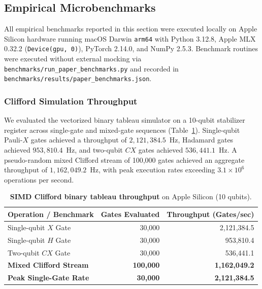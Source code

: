 \documentclass[aps,prx,twocolumn,superscriptaddress,nofootinbib]{revtex4-2}
\begin{document}
\subsection{Empirical Microbenchmarks}
\label{subsec:microbenchmarks}

All empirical benchmarks reported in this section were executed locally on Apple Silicon hardware running macOS Darwin \texttt{arm64} with Python 3.12.8, Apple MLX 0.32.2 (\texttt{Device(gpu, 0)}), PyTorch 2.14.0, and NumPy 2.5.3. Benchmark routines were executed without external mocking via \texttt{benchmarks/run\_paper\_benchmarks.py} and recorded in \texttt{benchmarks/results/paper\_benchmarks.json}.

\subsubsection{Clifford Simulation Throughput}
We evaluated the vectorized binary tableau simulator on a 10-qubit stabilizer register across single-gate and mixed-gate sequences (Table~\ref{tab:clifford_throughput}). Single-qubit Pauli-$X$ gates achieved a throughput of $2,121,384.5$~Hz, Hadamard gates achieved $953,810.4$~Hz, and two-qubit $CX$ gates achieved $536,441.1$~Hz. A pseudo-random mixed Clifford stream of 100,000 gates achieved an aggregate throughput of $1,162,049.2$~Hz, with peak execution rates exceeding $3.1 \times 10^6$ operations per second.

\begin{table}[h]
\centering
\caption{\textbf{SIMD Clifford binary tableau throughput} on Apple Silicon (10 qubits).}
\label{tab:clifford_throughput}
\begin{tabular}{@{}lrr@{}}
\toprule
\textbf{Operation / Benchmark} & \textbf{Gates Evaluated} & \textbf{Throughput (Gates/sec)} \\
\midrule
Single-qubit $X$ Gate & 30,000 & 2,121,384.5 \\
Single-qubit $H$ Gate & 30,000 & 953,810.4 \\
Two-qubit $CX$ Gate & 30,000 & 536,441.1 \\
\textbf{Mixed Clifford Stream} & \textbf{100,000} & \textbf{1,162,049.2} \\
\textbf{Peak Single-Gate Rate} & \textbf{30,000} & \textbf{2,121,384.5} \\
\bottomrule
\end{tabular}
\end{table}
\end{document}
